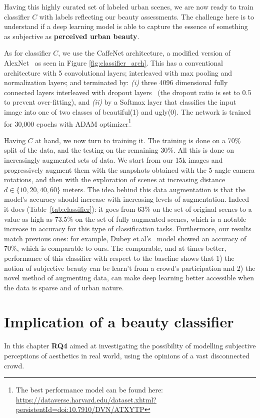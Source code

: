 Having this highly curated set of labeled urban scenes, we are now ready to train classifier $C$ with labels reflecting our beauty assessments. The challenge here is to understand if a deep learning model is able to capture the essence of something as subjective as \textbf{perceived urban beauty}.

As for classifier $C$, we use the CaffeNet architecture, a modified version of AlexNet~\cite{krizhevsky2012imagenet,szegedy2015going} as seen in Figure \ref{fig:classifier_arch}. This has a conventional architecture with 5 convolutional layers; interleaved with  max pooling and normalization layers; and terminated by: \emph{(i)} three 4096 dimensional fully connected layers interleaved with dropout layers~\cite{srivastava2014dropout} (the dropout ratio is set to 0.5 to prevent over-fitting), and \emph{(ii)} by a Softmax layer that classifies the input image into one of two classes of beautiful(1) and ugly(0). The network is trained for 30,000 epochs with ADAM optimizer\footnote{The best performance model can be found here: \url{https://dataverse.harvard.edu/dataset.xhtml?persistentId=doi:10.7910/DVN/ATXYTP}}

Having $C$ at hand, we now turn to training it. The training is done on a 70\% split of the data, and the testing on the remaining 30\%. All this is done on increasingly augmented sets of data. We start from our 15k images and progressively augment them with  the snapshots obtained with the 5-angle camera rotations, and then with the exploration of scenes at increasing distance $d \in \{10,20,40,60\}$ meters. The idea behind this data augmentation is that the model's accuracy should increase with increasing levels of augmentation. Indeed it does (Table~\ref{tab:classifier}): it goes from 63\% on the set of original scenes to a value as high as  73.5\% on the set of fully augmented scenes, which is a notable increase in accuracy for this type of classification tasks. Furthermore, our results match previous ones: for example,  Dubey et.al's~\cite{dubey2016deep}  model showed an accuracy of 70\%, which is comparable to ours. 
The comparable, and at times better, performance of this classifier with respect to the baseline shows that 1) the notion of subjective beauty can be learn't from a crowd's participation and 2) the novel method of augmenting data, can make deep learning better accessible when the data is sparse and of urban nature.

\section{Implication of a beauty classifier}
In this chapter \textbf{RQ4} aimed at investigating the possibility of modelling subjective perceptions of aesthetics in real world, using the opinions of a vast disconnected crowd.
 
